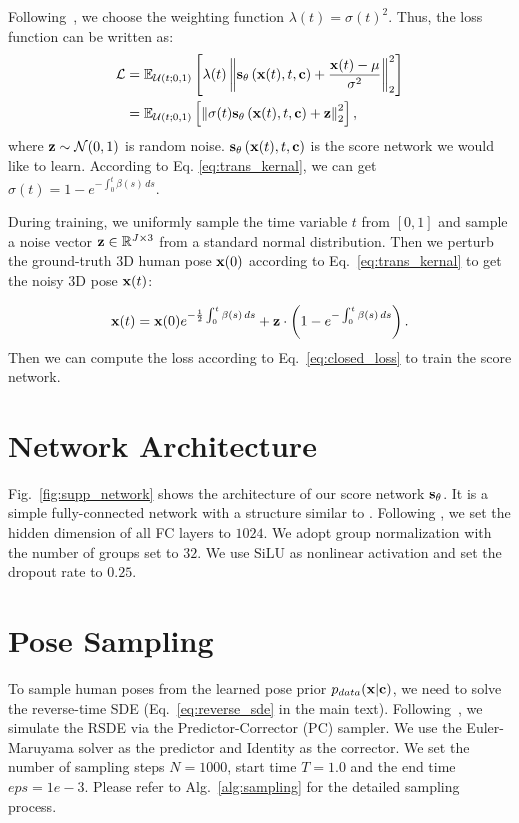 \documentclass[10pt,twocolumn,letterpaper]{article}
\begin{document}
Following~\cite{song2019generative}, we choose the weighting function $\lambda(t) = \sigma(t)^2$. Thus, the loss function can be written as:
\begin{equation}
\begin{aligned}
    \mathcal{L} & = {} \mathbb{E}_{\mathcal U(t;0, 1)} \left[ \lambda(t) \left\lVert\mathbf{s}_{\theta} \left( \mathbf{x}(t), t, \mathbf{c} \right) + \frac{\mathbf{x}(t) - \mu}{\sigma^2} \right\rVert_2^2 \right] \\
      & = {} \mathbb{E}_{\mathcal U(t;0, 1)} \left[\left\lVert\sigma(t) \mathbf{s}_{\theta}\left(\mathbf{x}(t), t, \mathbf{c}\right) + \mathbf{z} \right\rVert_2^2 \right],
\end{aligned}
\label{eq:closed_loss}
\end{equation}
where $\mathbf{z} \sim \mathcal{N}(0, 1)$ is random noise. $\mathbf{s}_{\theta} \left( \mathbf{x}(t), t, \mathbf{c} \right)$ is the score network we would like to learn. According to Eq. \ref{eq:trans_kernal}, we can get $\sigma(t) = 1 -  e^{-\int_{0}^{t} \beta (s) \, ds}$.

During training, we uniformly sample the time variable $t$ from $[0, 1]$ and sample a noise vector $\mathbf{z} \in \mathbb{R}^{J \times 3}$ from a standard normal distribution. Then we perturb the ground-truth 3D human pose $\mathbf{x}(0)$ according to Eq.~\ref{eq:trans_kernal} to get the noisy 3D pose $\mathbf{x}(t)$:

\begin{equation}
    \mathbf{x}(t) = \mathbf{x}(0) e^{- \frac{1}{2}  \int_{0}^{t} \beta (s) \, ds } + \mathbf{z} \cdot \left( 1 -  e^{-\int_{0}^{t} \beta (s) \, ds } \right). 
\end{equation}
Then we can compute the loss according to Eq.~\ref{eq:closed_loss} to train the score network.

\section{Network Architecture}
Fig.~\ref{fig:supp_network} shows the architecture of our score network $\mathbf{s}_{\theta}$. It is a simple fully-connected network with a structure similar to \cite{martinez_2017_3dbaseline}. Following \cite{martinez_2017_3dbaseline}, we set the hidden dimension of all FC layers to $1024$. We adopt group normalization \cite{wu2018group} with the number of groups set to $32$. We use SiLU \cite{hendrycks2016gaussian} as nonlinear activation and set the dropout rate to $0.25$.

\section{Pose Sampling}
\label{sec:supp_sampling}
To sample human poses from the learned pose prior $p_{data}(\mathbf{x}|\mathbf{c})$, we need to solve the reverse-time SDE (Eq.~\ref{eq:reverse_sde} in the main text). Following~\cite{song2020score}, we simulate the RSDE via the Predictor-Corrector (PC) sampler. We use the Euler-Maruyama solver as the predictor and Identity as the corrector. We set the number of sampling steps $N=1000$, start time $T=1.0$ and the end time $eps=1e-3$. Please refer to Alg.~\ref{alg:sampling} for the detailed sampling process.
\end{document}
